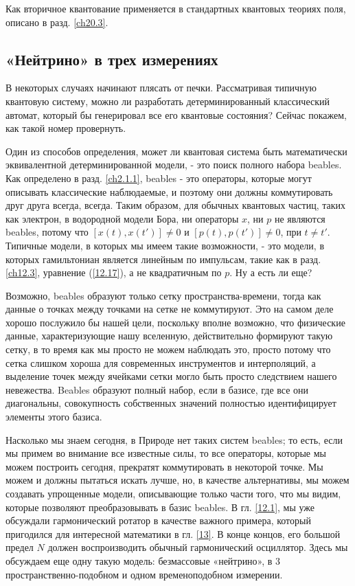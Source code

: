 \documentclass[main.tex]{subfiles}
\begin{document}
Как вторичное квантование применяется в стандартных квантовых теориях поля, описано в разд. \ref{ch20.3}.


\subsection{«Нейтрино» в трех измерениях}\label{ch15.2}

В некоторых случаях начинают плясать от печки. Рассматривая типичную квантовую систему, можно ли разработать детерминированный классический автомат, который бы генерировал все его квантовые состояния? Сейчас покажем, как такой номер провернуть.

Один из способов определения, может ли квантовая система быть математически эквивалентной детерминированной модели, - это поиск полного набора beables. Как определено в разд. \ref{ch2.1.1}, beables - это операторы, которые могут описывать классические наблюдаемые, и поэтому они должны коммутировать друг друга всегда, всегда. Таким образом, для обычных квантовых частиц, таких как электрон, в водородной модели Бора, ни операторы $x$, ни $p$ не являются beables, потому что $[x (t), x (t ')] \neq 0$ и $[p (t), p (t') ] \neq 0$, при $t \neq t '$. Типичные модели, в которых мы имеем такие возможности, - это модели, в которых гамильтониан является линейным по импульсам, такие как в разд. \ref{ch12.3}, уравнение (\ref{12.17}), а не квадратичным по $p$. Ну а есть ли еще?

Возможно, beables образуют только сетку пространства-времени, тогда как данные о точках между точками на сетке не коммутируют. Это на самом деле хорошо послужило бы нашей цели, поскольку вполне возможно, что физические данные, характеризующие нашу вселенную, действительно формируют такую сетку, в то время как мы просто не можем наблюдать это, просто потому что сетка слишком хороша для современных инструментов и интерполяций, а выделение точек между ячейками сетки могло быть просто следствием нашего невежества.
Beables образуют полный набор, если в базисе, где все они диагональны, совокупность собственных значений полностью идентифицирует элементы этого базиса.

Насколько мы знаем сегодня, в Природе нет таких систем beables; то есть, если мы примем во внимание все известные силы, то все операторы, которые мы можем построить сегодня, прекратят коммутировать в некоторой точке. Мы можем и должны пытаться искать лучше, но, в качестве альтернативы, мы можем создавать упрощенные модели, описывающие только части того, что мы видим, которые позволяют преобразовывать в базис beables. В гл. \ref{12.1}, мы уже обсуждали гармонический ротатор в качестве важного примера, который пригодился для интересной математики в гл. \ref{13}. В конце концов, его большой предел $N$ должен воспроизводить обычный гармонический осциллятор. Здесь мы обсуждаем еще одну такую модель: безмассовые «нейтрино», в 3 пространственно-подобном и одном временоподобном измерении.
\end{document}
